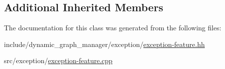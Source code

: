 \subsection*{Additional Inherited Members}


The documentation for this class was generated from the following files\+:\begin{DoxyCompactItemize}
\item 
include/dynamic\+\_\+graph\+\_\+manager/exception/\hyperlink{exception-feature_8hh}{exception-\/feature.\+hh}\item 
src/exception/\hyperlink{exception-feature_8cpp}{exception-\/feature.\+cpp}\end{DoxyCompactItemize}
